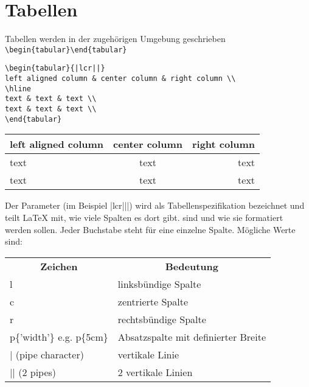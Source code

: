 \chapter{Tabellen}

Tabellen werden in der zugehörigen Umgebung geschrieben \verb|\begin{tabular}\end{tabular}|
\begin{lstlisting}[style=LaTeX]
\begin{tabular}{|lcr||}
left aligned column & center column & right column \\
\hline
text & text & text \\
text & text & text \\
\end{tabular}
\end{lstlisting}

\begin{tabular}{|lcr||}
	left aligned column & center column & right column \\
	\hline
	text & text & text \\
	text & text & text \\
\end{tabular}
\bigskip

Der Parameter (im Beispiel |lcr|||) wird als Tabellenspezifikation bezeichnet und teilt LaTeX mit, wie viele Spalten es dort gibt.
sind und wie sie formatiert werden sollen. Jeder Buchstabe steht für eine einzelne Spalte. Mögliche Werte sind:

\begin{table}[ht]
	\centering
	\begin{tabular}{ll}
		\multicolumn{1}{c}{\textbf{Zeichen}} & \multicolumn{1}{c}{\textbf{Bedeutung}}       \\
		l                           & linksbündige Spalte                 \\
		c                           & zentrierte Spalte                   \\
		r                           & rechtsbündige Spalte                \\
		p\{'width'\} e.g. p\{5cm\}  & Absatzspalte mit definierter Breite \\
		| (pipe character)          & vertikale Linie                     \\
		|| (2 pipes)                & 2 vertikale Linien                 
	\end{tabular}
\end{table}

